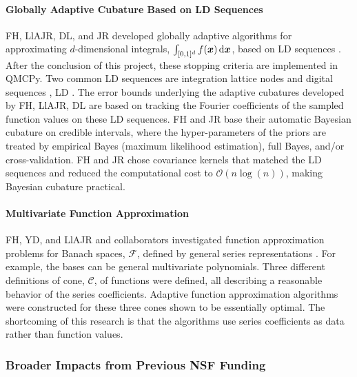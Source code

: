 \documentclass[11pt]{NSFamsart}
\newcommand{\bx}{{\boldsymbol{x}}}
\def\dif{\textup{d}}
\newcommand{\calc}{{\mathcal{C}}}
\newcommand{\calf}{{\mathcal{F}}}
\newcommand{\Order}{\mathcal{O}}
\begin{document}
\paragraph{Globally Adaptive Cubature Based on LD Sequences} \hypertarget{QMClink}{}
\label{sec:QMC}
FH, LlAJR, DL, and JR developed globally adaptive algorithms for approximating $d$-dimensional integrals,  $\int_{[0,1]^d} f(\bx) \, \dif \bx$, based on LD sequences \cite{HicJim16a,HicEtal17a,JimHic16a}.  After the conclusion of this project, these stopping criteria are implemented in QMCPy. Two common LD sequences are integration lattice nodes and digital sequences \cite{DicEtal14a}, LD .  The error bounds underlying the adaptive cubatures developed by FH, LlAJR, DL are based on tracking the  Fourier coefficients of the sampled function values on these LD sequences.  FH and JR base their automatic Bayesian cubature on credible intervals, where the hyper-parameters of the priors are treated by empirical Bayes (maximum likelihood estimation), full Bayes, and/or cross-validation.   FH and JR chose covariance kernels that matched the LD sequences and reduced the computational cost to $\Order(n \log(n))$, making Bayesian cubature practical. 

\paragraph{Multivariate Function Approximation} \label{sec:PrevFunAppx}
FH, YD, and LlAJR and collaborators investigated function approximation problems for Banach spaces, $\calf$, defined by general series representations \cite{DinHic20a,DinEtal20a}.  For example, the bases can be general multivariate polynomials.  Three different definitions of cone, $\calc$, of functions were defined, all describing a reasonable behavior of the series coefficients.  Adaptive function approximation algorithms were constructed for these three cones shown to be essentially optimal.  The shortcoming of this research is that the algorithms use series coefficients as data rather than function values. 


\subsubsection{Broader Impacts from Previous NSF Funding} \label{prevBIsect}
\phantom{a}
\end{document}
